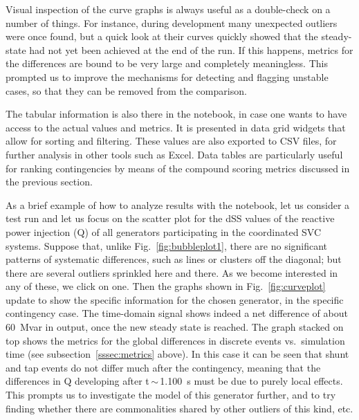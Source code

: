 \documentclass[conference]{IEEEtran}
\begin{document}
Visual inspection of the curve graphs is always useful as a double-check on a
number of things. For instance, during development many unexpected
outliers were once found, but a quick look at their curves quickly showed that the steady-state
had not yet been achieved at the end of the run. If this happens, metrics for
the differences are bound to be very large and completely meaningless.  This
prompted us to improve the mechanisms for detecting and flagging unstable cases,
so that they can be removed from the comparison.

The tabular information is also there in the notebook, in case one wants to have
access to the actual values and metrics. It is presented in data grid widgets
that allow for sorting and filtering.  These values are also exported to CSV
files, for further analysis in other tools such as Excel.  Data tables are
particularly useful for ranking contingencies by means of the compound scoring
metrics discussed in the previous section.

As a brief example of how to analyze results with the notebook, let us consider
a test run and let us focus on the scatter plot for the dSS values of the
reactive power injection (Q) of all generators participating in the coordinated
SVC systems. Suppose that, unlike Fig.~\ref{fig:bubbleplot1}, there are no
significant patterns of systematic differences, such as lines or clusters off
the diagonal; but there are several outliers sprinkled here and there.  As we
become interested in any of these, we click on one. Then the graphs shown in
Fig.~\ref{fig:curveplot} update to show the specific information for the chosen
generator, in the specific contingency case. The time-domain signal shows indeed
a net difference of about \SI{60}{Mvar} in output, once the new steady state is
reached. The graph stacked on top shows the metrics for the global differences
in discrete events vs.~simulation time (see subsection~\ref{sssec:metrics}
above).  In this case it can be seen that shunt and tap events do not differ
much after the contingency, meaning that the differences in Q developing after
t\,$\sim$\,\SI{1,100}{s} must be due to purely local effects. This prompts us to
investigate the model of this generator further, and to try finding whether
there are commonalities shared by other outliers of this kind, etc.

\end{document}
